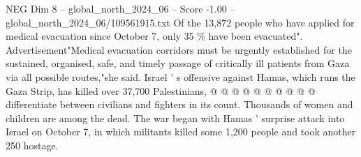 \begin{textsample}{NEG Dim 8 – global\_north\_2024\_06 – Score -1.00 – global\_north\_2024\_06/109561915.txt}
Of the 13,872 people who have applied for medical evacuation since October 7, only 35 \% have been evacuated".
Advertisement"Medical evacuation corridors must be urgently established for the sustained, organised, safe, and timely passage of critically ill patients from Gaza via all possible routes,"she said.
Israel ' s offensive against Hamas, which runs the Gaza Strip, has killed over 37,700 Palestinians, @ @ @ @ @ @ @ @ @ @ differentiate between civilians and fighters in its count.
Thousands of women and children are among the dead.
The war began with Hamas ' surprise attack into Israel on October 7, in which militants killed some 1,200 people and took another 250 hostage.

\end{textsample}
